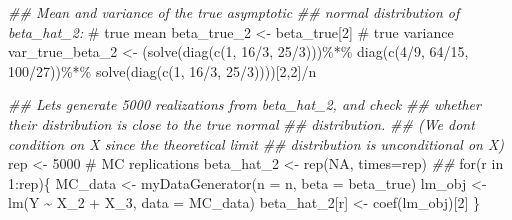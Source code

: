 \documentclass[
  letterpaper,
  DIV=11,
  numbers=noendperiod]{scrreprt}
\newenvironment{Shaded}{\begin{snugshade}}{\end{snugshade}}
\newcommand{\AttributeTok}[1]{\textcolor[rgb]{0.40,0.45,0.13}{#1}}
\newcommand{\CommentTok}[1]{\textcolor[rgb]{0.37,0.37,0.37}{#1}}
\newcommand{\ConstantTok}[1]{\textcolor[rgb]{0.56,0.35,0.01}{#1}}
\newcommand{\ControlFlowTok}[1]{\textcolor[rgb]{0.00,0.23,0.31}{#1}}
\newcommand{\DecValTok}[1]{\textcolor[rgb]{0.68,0.00,0.00}{#1}}
\newcommand{\DocumentationTok}[1]{\textcolor[rgb]{0.37,0.37,0.37}{\textit{#1}}}
\newcommand{\FunctionTok}[1]{\textcolor[rgb]{0.28,0.35,0.67}{#1}}
\newcommand{\NormalTok}[1]{\textcolor[rgb]{0.00,0.23,0.31}{#1}}
\newcommand{\OtherTok}[1]{\textcolor[rgb]{0.00,0.23,0.31}{#1}}
\newcommand{\SpecialCharTok}[1]{\textcolor[rgb]{0.37,0.37,0.37}{#1}}
\theoremstyle{definition}
\theoremstyle{plain}
\theoremstyle{plain}
\theoremstyle{remark}
\begin{document}
{\begin{Shaded}
\begin{Highlighting}[]
\DocumentationTok{\#\# Mean and variance of the true asymptotic }
\DocumentationTok{\#\# normal distribution of beta\_hat\_2:}
\CommentTok{\# true mean}
\NormalTok{beta\_true\_2     }\OtherTok{\textless{}{-}}\NormalTok{ beta\_true[}\DecValTok{2}\NormalTok{] }
\CommentTok{\# true variance}
\NormalTok{var\_true\_beta\_2 }\OtherTok{\textless{}{-}}\NormalTok{ (}\FunctionTok{solve}\NormalTok{(}\FunctionTok{diag}\NormalTok{(}\FunctionTok{c}\NormalTok{(}\DecValTok{1}\NormalTok{, }\DecValTok{16}\SpecialCharTok{/}\DecValTok{3}\NormalTok{, }\DecValTok{25}\SpecialCharTok{/}\DecValTok{3}\NormalTok{)))}\SpecialCharTok{\%*\%} 
                          \FunctionTok{diag}\NormalTok{(}\FunctionTok{c}\NormalTok{(}\DecValTok{4}\SpecialCharTok{/}\DecValTok{9}\NormalTok{, }\DecValTok{64}\SpecialCharTok{/}\DecValTok{15}\NormalTok{, }\DecValTok{100}\SpecialCharTok{/}\DecValTok{27}\NormalTok{))}\SpecialCharTok{\%*\%} 
                    \FunctionTok{solve}\NormalTok{(}\FunctionTok{diag}\NormalTok{(}\FunctionTok{c}\NormalTok{(}\DecValTok{1}\NormalTok{, }\DecValTok{16}\SpecialCharTok{/}\DecValTok{3}\NormalTok{, }\DecValTok{25}\SpecialCharTok{/}\DecValTok{3}\NormalTok{))))[}\DecValTok{2}\NormalTok{,}\DecValTok{2}\NormalTok{]}\SpecialCharTok{/}\NormalTok{n}

\DocumentationTok{\#\# Let\textquotesingle{}s generate 5000 realizations from beta\_hat\_2, and check }
\DocumentationTok{\#\# whether their distribution is close to the true normal }
\DocumentationTok{\#\# distribution.}
\DocumentationTok{\#\# (We don\textquotesingle{}t condition on X since the theoretical limit }
\DocumentationTok{\#\# distribution is unconditional on X)}
\NormalTok{rep        }\OtherTok{\textless{}{-}} \DecValTok{5000} \CommentTok{\# MC replications}
\NormalTok{beta\_hat\_2 }\OtherTok{\textless{}{-}} \FunctionTok{rep}\NormalTok{(}\ConstantTok{NA}\NormalTok{, }\AttributeTok{times=}\NormalTok{rep)}
\DocumentationTok{\#\#}
\ControlFlowTok{for}\NormalTok{(r }\ControlFlowTok{in} \DecValTok{1}\SpecialCharTok{:}\NormalTok{rep)\{}
\NormalTok{    MC\_data }\OtherTok{\textless{}{-}} \FunctionTok{myDataGenerator}\NormalTok{(}\AttributeTok{n    =}\NormalTok{ n, }
                               \AttributeTok{beta =}\NormalTok{ beta\_true)}
\NormalTok{    lm\_obj        }\OtherTok{\textless{}{-}} \FunctionTok{lm}\NormalTok{(Y }\SpecialCharTok{\textasciitilde{}}\NormalTok{ X\_2 }\SpecialCharTok{+}\NormalTok{ X\_3, }\AttributeTok{data =}\NormalTok{ MC\_data)}
\NormalTok{    beta\_hat\_2[r] }\OtherTok{\textless{}{-}} \FunctionTok{coef}\NormalTok{(lm\_obj)[}\DecValTok{2}\NormalTok{]}
\NormalTok{\}}


\end{Highlighting}
\end{Shaded}}
\end{document}
